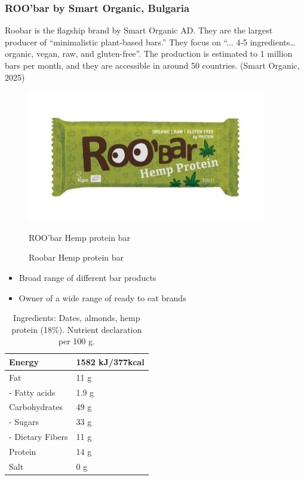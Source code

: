 \subsubsection*{ROO'bar by Smart Organic, Bulgaria}
Roobar is the flagship brand by Smart Organic AD. They are the largest producer of “minimalistic plant-based bars.” They focus on “... 4-5 ingredients… organic, vegan, raw, and gluten-free”. The production is estimated to 1 million bars per month, and they are accessible in around 50 countries. (Smart Organic, 2025)
\begin{figure} 
    \centering
    \includegraphics[width=\linewidth]{Figures/fig_03.jpg}
    \caption{ROO'bar Hemp protein bar}
    \caption*{Roobar Hemp protein bar}
    \label{fig:introduction_03}
\end{figure}


\begin{itemize}
    \item Broad range of different bar products
    \item Owner of a wide range of ready to eat brands
\end{itemize}


\begin{table} 
    \centering
    \caption{Ingredients: Dates, almonds, hemp protein (18\%). Nutrient declaration per 100 g.}
    \label{tab:your_label}
    \begin{tabular}{|l|l|} 
        \hline
        Energy & 1582 kJ/377kcal \\ 
        \hline
        Fat & 11 g \\ 
        \hline
        - Fatty acids & 1.9 g \\ 
        \hline
        Carbohydrates & 49 g \\ 
        \hline
        - Sugars & 33 g \\ 
        \hline
        - Dietary Fibers & 11 g \\ 
        \hline
        Protein & 14 g \\ 
        \hline
        Salt & 0 g \\ 
        \hline
    \end{tabular}
\end{table}

